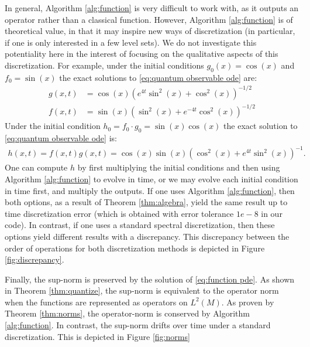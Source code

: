 \documentclass[final,leqno]{siamart}
\begin{document}
%
In general, Algorithm \ref{alg:function} is very difficult to work with, as it outputs an operator rather than a classical function.
However, Algorithm \ref{alg:function} is of theoretical value, in that it may inspire new ways of discretization (in particular, if one is only interested in a few level sets).
We do not investigate this potentiality here in the interest of focusing on the qualitative aspects of this discretization.
For example, under the initial conditions $g_{0}(x) = \cos(x)$ and $f_{0} = \sin(x)$ the exact solutions to \eqref{eq:quantum observable ode} are:
\begin{align*}
	g(x,t) &= \cos(x) \left( e^{4t} \sin^{2}(x) + \cos^{2}(x) \right)^{-1/2}\\
	f(x,t) &= \sin(x) \left( \sin^{2}(x) + e^{-4t} \cos^{2}(x) \right)^{-1/2}
\end{align*}
Under the initial condition $h_{0} = f_{0} \cdot g_{0}  = \sin(x) \cos(x)$ the exact solution to \eqref{eq:quantum observable ode} is:
\begin{align*}
	h(x,t) = f(x,t) g(x,t) = \cos(x) \sin(x) \left( \cos^{2}(x) + e^{4t} \sin^{2}(x) \right)^{-1}.
\end{align*}
One can compute $h$ by first multiplying the initial conditions and then using Algorithm \ref{alg:function} to evolve in time, or we may evolve each initial condition in time first, and multiply the outputs.
If one uses Algorithm \ref{alg:function}, then both options, as a result of Theorem \ref{thm:algebra}, yield the same result up to time discretization error (which is obtained with error tolerance $1e-8$ in our code).
In contrast, if one uses a standard spectral discretization, then these options yield different results with a discrepancy.
This discrepancy between the order of operations for both discretization methods is depicted in Figure \ref{fig:discrepancy}.

Finally, the sup-norm is preserved by the solution of \eqref{eq:function pde}.
As shown in Theorem \ref{thm:quantize}, the sup-norm is equivalent to the operator norm when the functions are represented as operators on $L^{2}(M)$.
As proven by Theorem \ref{thm:norms}, the operator-norm is conserved by Algorithm \ref{alg:function}.
In contrast, the sup-norm drifts over time under a standard discretization.  
This is depicted in Figure \ref{fig:norms}
\end{document}
